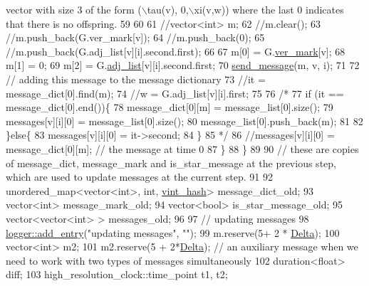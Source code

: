 \begin{DoxyCode}
{       vector with size 3 of the form (\(\backslash\)tau(v), 0,\(\backslash\)xi(v,w)) where the last 0 indicates that there is no offspring.}
59 
60 
61       \textcolor{comment}{//vector<int> m;}
62       \textcolor{comment}{//m.clear();}
63       \textcolor{comment}{//m.push\_back(G.ver\_mark[v]);}
64       \textcolor{comment}{//m.push\_back(0);}
65       \textcolor{comment}{//m.push\_back(G.adj\_list[v][i].second.first);}
66 
67       m[0] = G.\hyperlink{classmarked__graph_ac83e9377dd4d8bb95be1ac949b127296}{ver\_mark}[v];
68       m[1] = 0;
69       m[2] = G.\hyperlink{classmarked__graph_a1a0bf7ca413a278763f7c878b3b6fd6f}{adj\_list}[v][i].second.first;
70       \hyperlink{classgraph__message_aa76d1d5420a12477fa1dddd878d78c8f}{send\_message}(m, v, i);
71 
72       \textcolor{comment}{// adding this message to the message dictionary}
73       \textcolor{comment}{//it = message\_dict[0].find(m);}
74       \textcolor{comment}{//w = G.adj\_list[v][i].first;}
75 
76       \textcolor{comment}{/*}
77 \textcolor{comment}{      if (it == message\_dict[0].end())\{}
78 \textcolor{comment}{        message\_dict[0][m] = message\_list[0].size();}
79 \textcolor{comment}{        messages[v][i][0] = message\_list[0].size();}
80 \textcolor{comment}{        message\_list[0].push\_back(m);}
81 \textcolor{comment}{}
82 \textcolor{comment}{      \}else\{}
83 \textcolor{comment}{        messages[v][i][0] = it->second;}
84 \textcolor{comment}{      \}}
85 \textcolor{comment}{      */}
86       \textcolor{comment}{//messages[v][i][0] = message\_dict[0][m]; // the message at time 0}
87     \}
88   \}
89 
90   \textcolor{comment}{// these are copies of message\_dict, message\_mark and is\_star\_message at the previous step, which are
       used to update messages at the current step.}
91 
92   unordered\_map<vector<int>, int, \hyperlink{structvint__hash}{vint\_hash}> message\_dict\_old;
93   vector<int> message\_mark\_old;
94   vector<bool> is\_star\_message\_old;
95   vector<vector<int> > messages\_old;
96 
97   \textcolor{comment}{// updating messages}
98   \hyperlink{classlogger_a710163deb17bc81f70d53d285b8ac9ac}{logger::add\_entry}(\textcolor{stringliteral}{"updating messages"}, \textcolor{stringliteral}{""});
99   m.reserve(5+ 2 * \hyperlink{classgraph__message_a45dfd061b7bc73572e5132fbf66efd55}{Delta});
100   vector<int> m2;
101   m2.reserve(5 + 2*\hyperlink{classgraph__message_a45dfd061b7bc73572e5132fbf66efd55}{Delta}); \textcolor{comment}{// an auxiliary message when we need to work with two types of messages
       simultaneously }
102   duration<float> diff;
103   high\_resolution\_clock::time\_point t1, t2; 

\end{DoxyCode}
